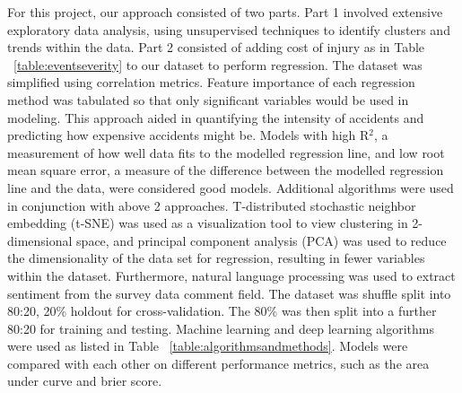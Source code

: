 \documentclass{llncs}
\begin{document}
For this project, our approach consisted of two parts. Part 1 involved extensive exploratory data analysis, using unsupervised techniques to identify clusters and trends within the data. Part 2 consisted of adding cost of injury as in Table ~\ref{table:eventseverity} to our dataset to perform regression. The dataset was simplified using correlation metrics. Feature importance  of each regression method was tabulated so that only significant variables would be used in modeling. This approach aided in quantifying the intensity of accidents and predicting how expensive accidents might be. Models with high R$^{2}$, a measurement of how well data fits to the modelled regression line, and low root mean square error, a measure of the difference between the modelled regression line and the data, were considered good models.
Additional algorithms were used in conjunction with above 2 approaches. T-distributed stochastic neighbor embedding (t-SNE) was used as a visualization tool to view clustering in 2-dimensional space, and principal component analysis (PCA) was used to reduce the dimensionality of the data set for regression, resulting in fewer variables within the dataset. Furthermore, natural language processing was used to extract sentiment from the survey data comment field.
The dataset was shuffle split into 80:20, 20\% holdout for cross-validation. The 80\% was then split into a further 80:20 for training and testing. Machine learning and deep learning algorithms were used as listed in Table ~\ref{table:algorithmsandmethods}. Models were compared with each other on different performance metrics, such as the area under curve and brier score.
%
\FloatBarrier
\end{document}
